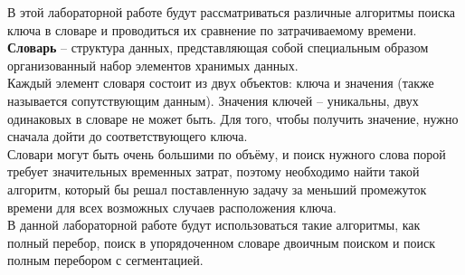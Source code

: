 В этой лабораторной работе будут рассматриваться различные алгоритмы поиска ключа в словаре и проводиться их сравнение по затрачиваемому времени. \\

\textbf{Словарь} -- структура данных, представляющая собой специальным образом организованный набор элементов хранимых данных. \\

Каждый элемент словаря состоит из двух объектов: ключа и значения (также называется сопутствующим данным). Значения ключей -- уникальны, двух одинаковых в словаре не может быть. Для того, чтобы получить значение, нужно сначала дойти до соответствующего ключа.\\

Словари могут быть очень большими по объёму, и поиск нужного слова порой требует значительных временных затрат, поэтому необходимо найти такой алгоритм, который бы решал поставленную задачу за меньший промежуток времени для всех возможных случаев расположения ключа.\\

В данной лабораторной работе будут использоваться такие алгоритмы, как полный перебор, поиск в упорядоченном словаре двоичным поиском и поиск полным перебором с сегментацией.

